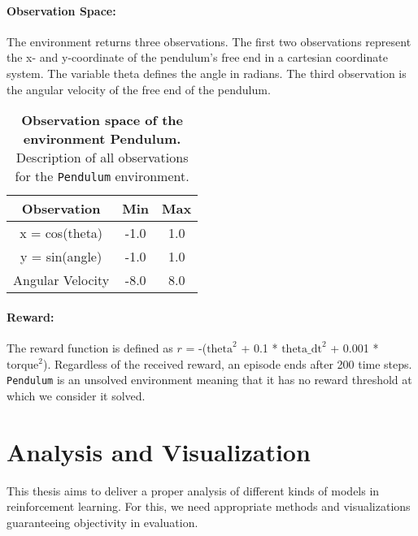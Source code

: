 \paragraph*{Observation Space:} The environment returns three observations. The first two observations represent the x- and y-coordinate of the pendulum's free end in a cartesian coordinate system. The variable theta defines the angle in radians. The third observation is the angular velocity of the free end of the pendulum.

\begin{table}[!ht]
  \centering
  \begin{tabular}{ |c|c|c| }
    \hline
    Observation & Min & Max \\
    \hline
    x = cos(theta) & -1.0 & 1.0 \\
    y = sin(angle) & -1.0 & 1.0 \\
    Angular Velocity & -8.0 & 8.0 \\
    \hline
  \end{tabular}
  \caption[Observation space of the environment Pendulum]{
    \textbf{Observation space of the environment Pendulum.}
    Description of all observations for the \texttt{Pendulum} environment.
  }
  \label{table:pendulum_obs}
\end{table}

\paragraph*{Reward:} The reward function is defined as $r$ = -($\text{theta}^2$ + 0.1 * $\text{theta\_dt}^2$ + 0.001 * $\text{torque}^2$). Regardless of the received reward, an episode ends after 200 time steps. \verb|Pendulum| is an unsolved environment meaning that it has no reward threshold at which we consider it solved.


\section{Analysis and Visualization}
\label{sec:benchmarks}
This thesis aims to deliver a proper analysis of different kinds of models in reinforcement learning. For this, we need appropriate methods and visualizations guaranteeing objectivity in evaluation.
